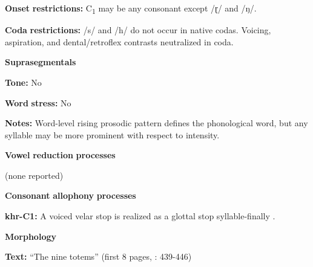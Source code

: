 \documentclass[output=paper]{langsci/langscibook}
\begin{document}
\begin{styleBody}
\textbf{Onset} \textbf{restrictions:} C\textsubscript{1} may be any consonant except /ɽ/ and /ŋ/.
\end{styleBody}

\begin{styleBody}
\textbf{Coda} \textbf{restrictions:} /s/ and /h/ do not occur in native codas. Voicing, aspiration, and dental/retroflex contrasts neutralized in coda.
\end{styleBody}

\begin{styleBody}
\textbf{Suprasegmentals}
\end{styleBody}

\begin{styleBody}
\textbf{Tone:} No
\end{styleBody}

\begin{styleBody}
\textbf{Word} \textbf{stress:} No
\end{styleBody}

\begin{styleBody}
\textbf{Notes:} Word-level rising prosodic pattern defines the phonological word, but any syllable may be more prominent with respect to intensity.
\end{styleBody}

\begin{styleBody}
\textbf{Vowel} \textbf{reduction} \textbf{processes}
\end{styleBody}

\begin{styleBody}
(none reported)
\end{styleBody}

\begin{styleBody}
\textbf{Consonant} \textbf{allophony} \textbf{processes}
\end{styleBody}

\begin{styleBody}
\textbf{khr-C1:} A voiced velar stop is realized as a glottal stop syllable-finally \citep[29]{Peterson2011}.
\end{styleBody}

\begin{styleBody}
\textbf{Morphology}
\end{styleBody}

\begin{styleBody}
\textbf{Text:} “The nine totems” (first 8 pages, \citealt{Peterson2011}: 439-446)
\end{styleBody}
\end{document}
